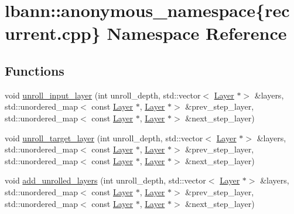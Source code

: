 \hypertarget{namespacelbann_1_1anonymous__namespace_02recurrent_8cpp_03}{}\section{lbann\+:\+:anonymous\+\_\+namespace\{recurrent.\+cpp\} Namespace Reference}
\label{namespacelbann_1_1anonymous__namespace_02recurrent_8cpp_03}
\subsection*{Functions}
\begin{DoxyCompactItemize}
\item 
void \hyperlink{namespacelbann_1_1anonymous__namespace_02recurrent_8cpp_03_a8c76387c2dd531058700ad9a41cd093a}{unroll\+\_\+input\+\_\+layer} (int unroll\+\_\+depth, std\+::vector$<$ \hyperlink{classlbann_1_1Layer}{Layer} $\ast$$>$ \&layers, std\+::unordered\+\_\+map$<$ const \hyperlink{classlbann_1_1Layer}{Layer} $\ast$, \hyperlink{classlbann_1_1Layer}{Layer} $\ast$$>$ \&prev\+\_\+step\+\_\+layer, std\+::unordered\+\_\+map$<$ const \hyperlink{classlbann_1_1Layer}{Layer} $\ast$, \hyperlink{classlbann_1_1Layer}{Layer} $\ast$$>$ \&next\+\_\+step\+\_\+layer)
\item 
void \hyperlink{namespacelbann_1_1anonymous__namespace_02recurrent_8cpp_03_af04adecd9a62fdcd16ae78b3e95d4bb5}{unroll\+\_\+target\+\_\+layer} (int unroll\+\_\+depth, std\+::vector$<$ \hyperlink{classlbann_1_1Layer}{Layer} $\ast$$>$ \&layers, std\+::unordered\+\_\+map$<$ const \hyperlink{classlbann_1_1Layer}{Layer} $\ast$, \hyperlink{classlbann_1_1Layer}{Layer} $\ast$$>$ \&prev\+\_\+step\+\_\+layer, std\+::unordered\+\_\+map$<$ const \hyperlink{classlbann_1_1Layer}{Layer} $\ast$, \hyperlink{classlbann_1_1Layer}{Layer} $\ast$$>$ \&next\+\_\+step\+\_\+layer)
\item 
void \hyperlink{namespacelbann_1_1anonymous__namespace_02recurrent_8cpp_03_a16733e1fb301c3099a5fe07d703c3782}{add\+\_\+unrolled\+\_\+layers} (int unroll\+\_\+depth, std\+::vector$<$ \hyperlink{classlbann_1_1Layer}{Layer} $\ast$$>$ \&layers, std\+::unordered\+\_\+map$<$ const \hyperlink{classlbann_1_1Layer}{Layer} $\ast$, \hyperlink{classlbann_1_1Layer}{Layer} $\ast$$>$ \&prev\+\_\+step\+\_\+layer, std\+::unordered\+\_\+map$<$ const \hyperlink{classlbann_1_1Layer}{Layer} $\ast$, \hyperlink{classlbann_1_1Layer}{Layer} $\ast$$>$ \&next\+\_\+step\+\_\+layer)
$$
\end{DoxyCompactItemize}
